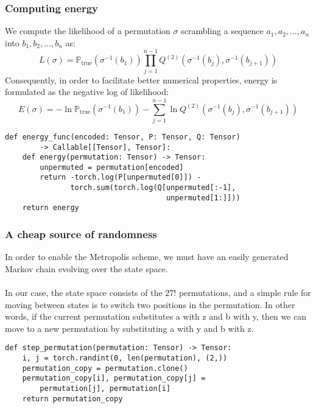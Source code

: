\documentclass[11pt]{article}
\begin{document}
\subsubsection{Computing energy}
We compute the likelihood of a permutation $\sigma$ scrambling a sequence $a_1, a_2, \hdots, a_n$ into $b_1, b_2, \hdots, b_n$ as:
$$L(\sigma) = \mathbb{P}_{\text{true}}(\sigma^{-1}(b_1)) \prod_{j=1}^{n-1}Q^{(2)}(\sigma^{-1}(b_j),\sigma^{-1}(b_{j+1}))$$
Consequently, in order to facilitate better numerical properties, energy is formulated as the negative log of likelihood:
$$E(\sigma) = -\ln\mathbb{P}_\text{true}(\sigma^{-1}(b_1)) - \sum_{j=1}^{n-1}\ln Q^{(2)}(\sigma^{-1}(b_j),\sigma^{-1}(b_{j+1}))$$

\begin{verbatim}
def energy_func(encoded: Tensor, P: Tensor, Q: Tensor)
        -> Callable[[Tensor], Tensor]:
    def energy(permutation: Tensor) -> Tensor:
        unpermuted = permutation[encoded]
        return -torch.log(P[unpermuted[0]]) -
               torch.sum(torch.log(Q[unpermuted[:-1],
                                     unpermuted[1:]]))
    return energy
\end{verbatim}

\subsubsection{A cheap source of randomness}
In order to enable the Metropolis scheme, we must have an easily generated Markov chain evolving over the state space.
\\\\
In our case, the state space consists of the $27!$ permutations, and a simple rule for moving between states is to switch two positions in the permutation. In other words, if the current permutation substitutes a with z and b with y, then we can move to a new permutation by substituting a with y and b with z.

\begin{verbatim}
def step_permutation(permutation: Tensor) -> Tensor:
    i, j = torch.randint(0, len(permutation), (2,))
    permutation_copy = permutation.clone()
    permutation_copy[i], permutation_copy[j] =
        permutation[j], permutation[i]
    return permutation_copy
\end{verbatim}
\end{document}

